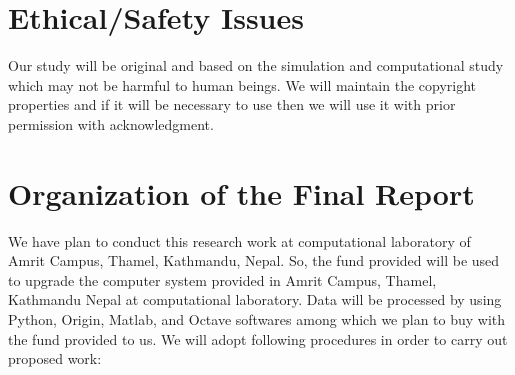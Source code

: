 \documentclass[fleqn,a4paper,12pt,oneside]{article}
\begin{document}
\section {Ethical/Safety Issues}
 Our study will be original and based on the simulation  and computational study which may not be harmful to human beings. We will maintain the copyright properties and if it will be necessary to use then we will use it with prior permission with acknowledgment.

\section{Organization of the Final Report} 
We have plan to conduct this research work at computational laboratory of Amrit Campus, Thamel, Kathmandu, Nepal. So, the fund provided will be used to upgrade the computer system provided in Amrit Campus, Thamel, Kathmandu Nepal at computational laboratory. Data will be processed by using Python, Origin, Matlab, and Octave softwares among which we plan to buy with the fund provided to us. We will adopt following procedures in order to carry out proposed work:
\end{document}
